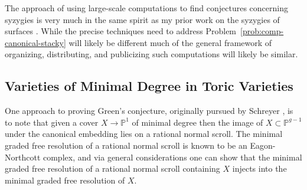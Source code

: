 \documentclass[11pt,reqno]{amsart}
\theoremstyle{remark}
\renewcommand{\P}{\mathbb{P}}
\newcommand{\juliette}[1]{{\color{red} \sf $\spadesuit\spadesuit\spadesuit$ Juliette: [#1]}}
\begin{document}

The approach of using large-scale computations to find conjectures concerning syzygies is very much in the same spirit as my prior work on the syzygies of surfaces \cite{bruceErmanGoldsteinYang18,BCEGLY22}. While the precise techniques need to address Problem~\ref{prob:comp-canonical-stacky} will likely be different much of the general framework of organizing, distributing, and publicizing such computations will likely be similar. 

 

\subsection{Varieties of Minimal Degree in Toric Varieties}\label{subsec:mini-dgre}

One approach to proving Green's conjecture, originally pursued by Schreyer \cite{schreyer86}, is to note that given a cover $X\to \P^{1}$ of minimal degree then the image of $X\subset \P^{g-1}$ under the canonical embedding lies on a rational normal scroll. The minimal graded free resolution of a rational normal scroll is known to be an Eagon-Northcott complex, and via general considerations one can show that the minimal graded free resolution of a rational normal scroll containing $X$ injects into the minimal graded free resolution of $X$. 
\end{document}
